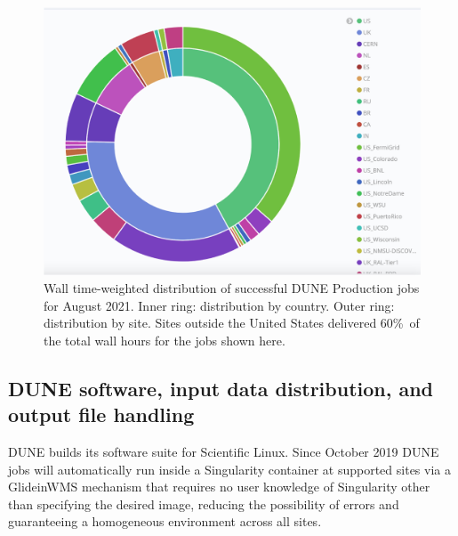 \documentclass[../main-v1.tex]{subfiles}
\begin{document}
\begin{figure}[htb]
\centering
\includegraphics[width=\textwidth]{graphics/Workflow/August2021.png}
\caption{Wall time-weighted distribution of successful DUNE Production jobs for August 2021. Inner ring: distribution by country. Outer ring: distribution by site. Sites outside the United States delivered 60\%\ of the total wall hours for the jobs shown here.}
\label{fig-country}       %
\end{figure}

\subsection{DUNE software, input data distribution, and output file handling}
\label{subsec:io}
DUNE builds its software suite for  Scientific Linux. Since October 2019 DUNE jobs will automatically run inside a Singularity container at supported sites via a GlideinWMS mechanism that requires no user knowledge of Singularity other than specifying the desired image, reducing the possibility of errors and guaranteeing a homogeneous environment across all sites.
\end{document}
